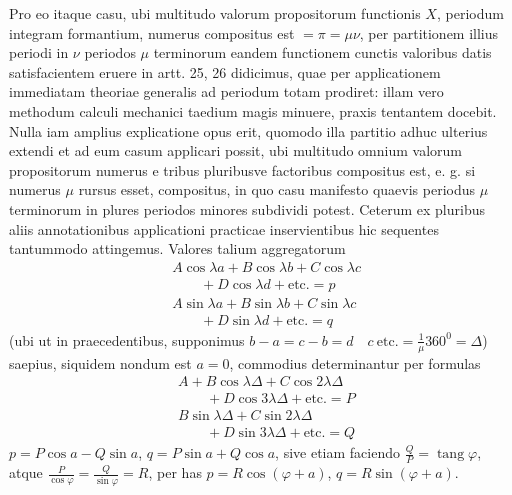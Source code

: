 Pro eo itaque casu, ubi multitudo valorum propositorum functionis $X$, periodum
integram formantium, numerus compositus est $=\pi=\mu\nu$, per partitionem illius
periodi in $\nu$ periodos $\mu$ terminorum eandem functionem cunctis valoribus
datis satisfacientem eruere in artt. 25, 26 didicimus, quae per applicationem
immediatam theoriae generalis ad periodum totam prodiret: illam vero methodum
calculi mechanici taedium magis minuere, praxis tentantem docebit. Nulla iam
amplius explicatione opus erit, quomodo illa partitio adhuc ulterius extendi et ad
eum casum applicari possit, ubi multitudo omnium valorum propositorum numerus
e tribus pluribusve factoribus compositus est, e. g. si numerus $\mu$
rursus esset, compositus, in quo casu manifesto quaevis periodus $\mu$ terminorum
in plures periodos minores subdividi potest. Ceterum ex pluribus aliis
annotationibus applicationi practicae inservientibus hic sequentes tantummodo
attingemus. Valores talium aggregatorum
\[
\begin{aligned}
&A\cos\lambda a+B\cos\lambda b+C\cos\lambda c\\[5pt]
&\qquad{}+D\cos\lambda d+\text{etc.}=p\\[5pt]
&A\sin\lambda a+B\sin\lambda b+C\sin\lambda c\\[5pt]
&\qquad{}+D\sin\lambda d+\text{etc.}=q
\end{aligned}
\]
(ubi ut in praecedentibus, supponimus $b-a=c-b=d\quad c\ \text{etc.}=\tfrac1\mu360^{\mathord{0}}=\Delta$)
saepius, siquidem nondum est $a=0$, commodius determinantur per formulas
\[
\begin{aligned}
&A+B\cos\lambda\Delta+C\cos2\lambda\Delta\\[5pt]
&\qquad{}+D\cos3\lambda\Delta+\text{etc.}=P\\[5pt]
&B\sin\lambda\Delta+C\sin2\lambda\Delta\\[5pt]
&\qquad{}+D\sin3\lambda\Delta+\text{etc.}=Q
\end{aligned}
\]
$p=P\cos a-Q\sin a$, $q=P\sin a+Q\cos a$, sive etiam faciendo
$\frac QP=\operatorname{tang}\varphi$, atque $\frac P{\cos\varphi}=\frac Q{\sin\varphi}=R$,
per has $p=R\cos(\varphi+a)$, $q=R\sin(\varphi+a)$.

